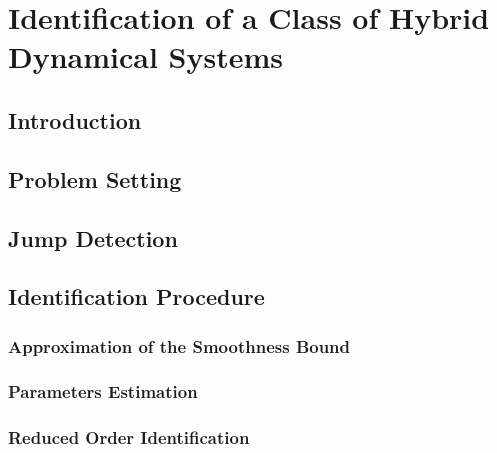 
\chapter{Identification of a Class of Hybrid Dynamical Systems}

\label{chap:glassclassification}
\minitoc

\thispagestyle{empty}

\newpage

\section{Introduction}


\section{Problem Setting}\label{ProblemS}


\section{Jump Detection}\label{JumpD}


\section{Identification Procedure}\label{Identification}
\subsection{Approximation of the Smoothness Bound}
\subsection{Parameters Estimation}
\subsection{Reduced Order Identification}
